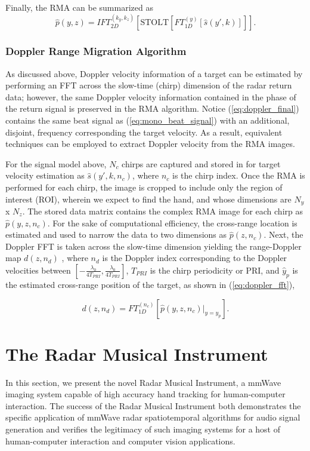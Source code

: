 \documentclass[10pt,journal,final]{IEEEtran}
\begin{document}
Finally, the RMA can be summarized as
\begin{equation}
\label{eq:rma_summary}
	\hat{p}(y,z) = IFT_{2D}^{(k_y,k_z)}\left[ \text{STOLT}\left[ FT_{1D}^{(y)}[\hat{s}(y',k)] \right] \right].
\end{equation}

\subsubsection{Doppler Range Migration Algorithm}
\label{subsubsec:doppler_rma}
As discussed above, Doppler velocity information of a target can be estimated by performing an FFT across the slow-time (chirp) dimension of the radar return data; however, the same Doppler velocity information contained in the phase of the return signal is preserved in the RMA algorithm. Notice (\ref{eq:doppler_final}) contains the same beat signal as (\ref{eq:mono_beat_signal}) with an additional, disjoint, frequency corresponding the target velocity. As a result, equivalent techniques can be employed to extract Doppler velocity from the RMA images. 

For the signal model above, $N_c$ chirps are captured and stored in for target velocity estimation as $\hat{s}(y',k,n_c)$, where $n_c$ is the chirp index. Once the RMA is performed for each chirp, the image is cropped to include only the region of interest (ROI), wherein we expect to find the hand, and whose dimensions are $N_y$ x $N_z$. The stored data matrix contains the complex RMA image for each chirp as $\hat{p}(y,z,n_c)$. For the sake of computational efficiency, the cross-range location is estimated and used to narrow the data to two dimensions as $\hat{p}(z,n_c)$. Next, the Doppler FFT is taken across the slow-time dimension yielding the range-Doppler map $d(z,n_d)$ \cite{ti:intro_to_FMCW_radars}, where $n_d$ is the Doppler index corresponding to the Doppler velocities between $[-\frac{\lambda_0}{4T_{PRI}},\frac{\lambda_0}{4T_{PRI}}]$, $T_{PRI}$ is the chirp periodicity or PRI, and $\hat{y}_p$ is the estimated cross-range position of the target, as shown in (\ref{eq:doppler_fft}),

\begin{equation}
\label{eq:doppler_fft}
	d(z,n_d) = FT_{1D}^{(n_c)} \left[ \hat{p}(y,z,n_c) \biggr\rvert_{y = \hat{y_p}} \right].
\end{equation}

\section{The Radar Musical Instrument}
\label{sec:the_radar_musical_instrument}
In this section, we present the novel Radar Musical Instrument, a mmWave imaging system capable of high accuracy hand tracking for human-computer interaction. The success of the Radar Musical Instrument both demonstrates the specific application of mmWave radar spatiotemporal algorithms for audio signal generation and verifies the legitimacy of such imaging systems for a host of human-computer interaction and computer vision applications.
\end{document}
